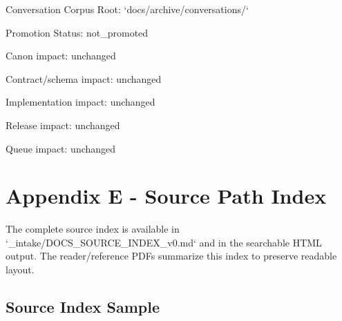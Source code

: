 \documentclass[11pt,a4paper]{report}
\begin{document}
Conversation Corpus Root: `docs/\allowbreak{}archive/\allowbreak{}conversations/\allowbreak{}`

Promotion Status: not\_promoted

Canon impact: unchanged

Contract/\allowbreak{}schema impact: unchanged

Implementation impact: unchanged

Release impact: unchanged

Queue impact: unchanged


\chapter{Appendix E - Source Path Index}

The complete source index is available in `\_intake/\allowbreak{}DOCS\_SOURCE\_INDEX\_v0.\allowbreak{}md` and in the searchable HTML output.\allowbreak{} The reader/\allowbreak{}reference PDFs summarize this index to preserve readable layout.\allowbreak{}


\section{Source Index Sample}
\end{document}
